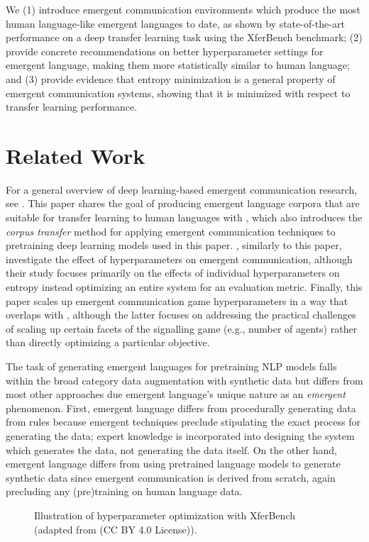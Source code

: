 We (1) introduce emergent communication environments which produce the most human language-like emergent languages to date, as shown by state-of-the-art performance on a deep transfer learning task using the XferBench benchmark;
(2) provide concrete recommendations on better hyperparameter settings for emergent language, making them more statistically similar to human language; and
(3) provide evidence that entropy minimization is a general property of emergent communication systems, showing that it is minimized with respect to transfer learning performance.


\section{Related Work}
\unskip\label{hpo:sec:related-work}
For a general overview of deep learning-based emergent communication research, see \citet{lazaridou2020emergentmultiagentcommunicationdeep}.
This paper shares the goal of producing emergent language corpora that are suitable for transfer learning to human languages with \citet{yao2022linking}, which also introduces the \emph{corpus transfer} method for applying emergent communication techniques to pretraining deep learning models used in this paper.
\citet{boldt2023mathmodel}, similarly to this paper, investigate the effect of hyperparameters on emergent communication, although their study focuses primarily on the effects of individual hyperparameters on entropy instead optimizing an entire system for an evaluation metric.
Finally, this paper scales up emergent communication game hyperparameters in a way that overlaps with \citet{chaabouni2022emergent}, although the latter focuses on addressing the practical challenges of scaling up certain facets of the signalling game (e.g., number of agents) rather than directly optimizing a particular objective.

The task of generating emergent languages for pretraining NLP models falls within the broad category data augmentation with synthetic data  but differs from most other approaches due emergent language's unique nature as an \emph{emergent} phenomenon.
First, emergent language differs from procedurally generating data from rules because emergent techniques preclude stipulating the exact process for generating the data; expert knowledge is incorporated into designing the system which generates the data, not generating the data itself.
On the other hand, emergent language differs from using pretrained language models to generate synthetic data since emergent communication is derived from scratch, again precluding any (pre)training on human language data.

\begin{figure*}
  \centering
  \caption{Illustration of hyperparameter optimization with XferBench (adapted from \citet{boldt-mortensen-2024-xferbench} (CC BY 4.0 License)).}
  \unskip\label{hpo:fig:xb}
\end{figure*}

